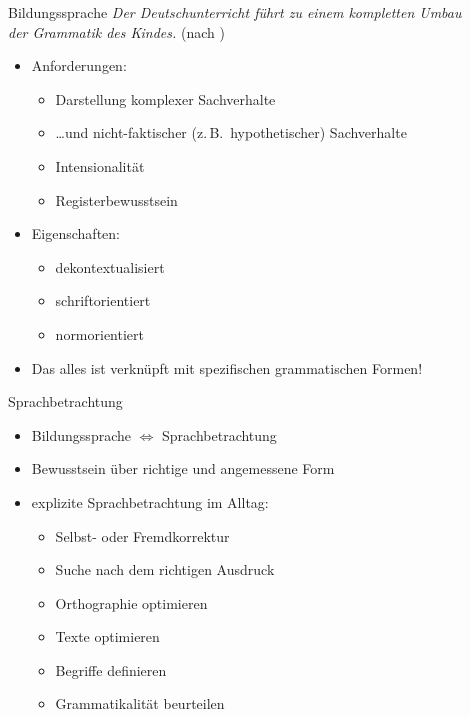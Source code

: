 \begin{frame}
  {Bildungssprache}
  \pause
  \alert{\textit{Der Deutschunterricht führt zu einem kompletten Umbau\\
  der Grammatik des Kindes.}} (nach \citealt{Bredel2013,Eisenberg2004})\\[\baselineskip]
  \pause
  \begin{itemize}[<+->]
    \item Anforderungen:
    \begin{itemize}[<+->]
      \item Darstellung komplexer Sachverhalte
      \item \dots und nicht-faktischer (z.\,B.\ hypothetischer) Sachverhalte
      \item Intensionalität
      \item Registerbewusstsein
    \end{itemize}
        \vspace{\baselineskip}
      \item Eigenschaften:
    \begin{itemize}[<+->]
      \item dekontextualisiert
      \item schriftorientiert
      \item normorientiert
    \end{itemize}
        \Halbzeile
      \item \alert{Das alles ist verknüpft mit spezifischen grammatischen Formen!}
  \end{itemize}
\end{frame}

\begin{frame}
  {Sprachbetrachtung}
  \pause
  \begin{itemize}[<+->]
    \item Bildungssprache $\Leftrightarrow$ Sprachbetrachtung
      \vspace{\baselineskip}
    \item Bewusstsein über richtige und angemessene Form
      \vspace{\baselineskip}
    \item explizite Sprachbetrachtung im Alltag:
      \begin{itemize}[<+->]
        \item Selbst- oder Fremdkorrektur
        \item Suche nach dem richtigen Ausdruck
        \item Orthographie optimieren
        \item Texte optimieren
        \item Begriffe definieren
        \item Grammatikalität beurteilen
      \end{itemize}
  \end{itemize}
\end{frame}

